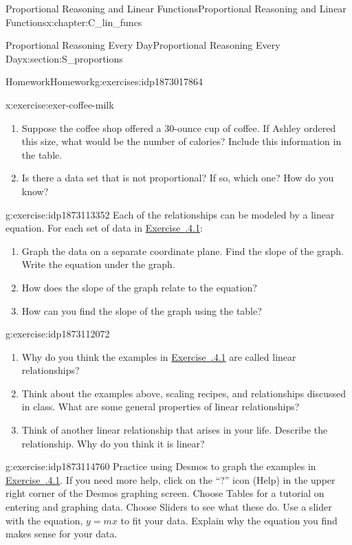 \documentclass[oneside,10pt,]{book}
\newcommand{\xreffont}{\relax}
\numberwithin{equation}{chapter}
\begin{document}
\begin{chapterptx}{Proportional Reasoning and Linear Functions}{}{Proportional Reasoning and Linear Functions}{}{}{x:chapter:C_lin_funcs}
\begin{sectionptx}{Proportional Reasoning Every Day}{}{Proportional Reasoning Every Day}{}{}{x:section:S_proportions}
\begin{exercises-subsection}{Homework}{}{Homework}{}{}{g:exercises:idp1873017864}
\begin{divisionexercise}{7}{}{}{x:exercise:exer-coffee-milk}
\begin{enumerate}[font=\bfseries,label=(\alph*),ref=\alph*]
\item{}Suppose the coffee shop offered a 30-ounce cup of coffee. If Ashley ordered this size, what would be the number of calories? Include this information in the table.%
\item{}Is there a data set that is not proportional? If so, which one? How do you know?%
\end{enumerate}
\end{divisionexercise}%
\begin{divisionexercise}{8}{}{}{g:exercise:idp1873113352}%
Each of the relationships can be modeled by a linear equation. For each set of data in \hyperlink{x:exercise:exer-walk-cycle}{Exercise~{\xreffont 2.5.4.1}\textendash{}{\xreffont 2.5.4.7}}:%
\begin{enumerate}[font=\bfseries,label=(\alph*),ref=\alph*]
\item{}Graph the data on a separate coordinate plane. Find the slope of the graph. Write the equation under the graph.%
\item{}How does the slope of the graph relate to the equation?%
\item{}How can you find the slope of the graph using the table?%
\end{enumerate}
\end{divisionexercise}%
\begin{divisionexercise}{9}{}{}{g:exercise:idp1873112072}%
\begin{enumerate}[font=\bfseries,label=(\alph*),ref=\alph*]
\item{}Why do you think the examples in \hyperlink{x:exercise:exer-walk-cycle}{Exercise~{\xreffont 2.5.4.1}\textendash{}{\xreffont 2.5.4.7}} are called linear relationships?%
\item{}Think about the examples above, scaling recipes, and relationships discussed in class. What are some general properties of linear relationships?%
\item{}Think of another linear relationship that arises in your life. Describe the relationship. Why do you think it is linear?%
\end{enumerate}
\end{divisionexercise}%
\begin{divisionexercise}{10}{}{}{g:exercise:idp1873114760}%
Practice using Desmos to graph the examples in \hyperlink{x:exercise:exer-walk-cycle}{Exercise~{\xreffont 2.5.4.1}\textendash{}{\xreffont 2.5.4.7}}. If you need more help, click on the ``?'' icon (Help) in the upper right corner of the Desmos graphing screen. Choose Tables for a tutorial on entering and graphing data. Choose Sliders to see what these do. Use a slider with the equation, \(y = mx\) to fit your data. Explain why the equation you find makes sense for your data.%

\end{divisionexercise}
\end{exercises-subsection}
\end{sectionptx}
\end{chapterptx}
\end{document}
